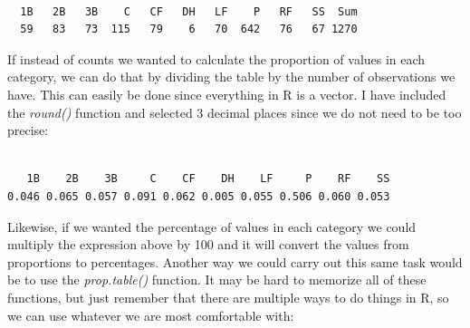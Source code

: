 \documentclass[
  letterpaper,
  DIV=11,
  numbers=noendperiod]{scrreprt}
\newenvironment{Shaded}{\begin{snugshade}}{\end{snugshade}}
\newcommand{\DecValTok}[1]{\textcolor[rgb]{0.68,0.00,0.00}{#1}}
\newcommand{\FunctionTok}[1]{\textcolor[rgb]{0.28,0.35,0.67}{#1}}
\newcommand{\NormalTok}[1]{\textcolor[rgb]{0.00,0.23,0.31}{#1}}
\newcommand{\SpecialCharTok}[1]{\textcolor[rgb]{0.37,0.37,0.37}{#1}}
\begin{document}
\begin{Shaded}
\end{Shaded}

\begin{verbatim}

  1B   2B   3B    C   CF   DH   LF    P   RF   SS  Sum 
  59   83   73  115   79    6   70  642   76   67 1270 
\end{verbatim}

If instead of counts we wanted to calculate the proportion of values in
each category, we can do that by dividing the table by the number of
observations we have. This can easily be done since everything in R is a
vector. I have included the \emph{round()} function and selected 3
decimal places since we do not need to be too precise:

\begin{Shaded}
\end{Shaded}

\begin{verbatim}

   1B    2B    3B     C    CF    DH    LF     P    RF    SS 
0.046 0.065 0.057 0.091 0.062 0.005 0.055 0.506 0.060 0.053 
\end{verbatim}

Likewise, if we wanted the percentage of values in each category we
could multiply the expression above by 100 and it will convert the
values from proportions to percentages. Another way we could carry out
this same task would be to use the \emph{prop.table()} function. It may
be hard to memorize all of these functions, but just remember that there
are multiple ways to do things in R, so we can use whatever we are most
comfortable with:

\begin{Shaded}
\end{Shaded}
\end{document}
